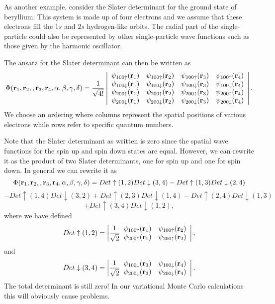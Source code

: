 As another example, consider the Slater determinant for the ground state of beryllium. This system
is made up of four electrons and we assume that these electrons fill the $1s$ and $2s$ hydrogen-like
orbits.  
The radial part of the single-particle could also be represented by other single-particle wave functions
such as those given by the harmonic oscillator.

The ansatz for the Slater determinant can then be written as  
\[
   \Phi({\bf r}_1,{\bf r}_2,,{\bf r}_3,{\bf r}_4, \alpha,\beta,\gamma,\delta)=\frac{1}{\sqrt{4!}}
\left| \begin{array}{cccc} \psi_{100\uparrow}({\bf r}_1)& \psi_{100\uparrow}({\bf r}_2)& \psi_{100\uparrow}({\bf r}_3)&\psi_{100\uparrow}({\bf r}_4) \\
\psi_{100\downarrow}({\bf r}_1)& \psi_{100\downarrow}({\bf r}_2)& \psi_{100\downarrow}({\bf r}_3)&\psi_{100\downarrow}({\bf r}_4) \\
\psi_{200\uparrow}({\bf r}_1)& \psi_{200\uparrow}({\bf r}_2)& \psi_{200\uparrow}({\bf r}_3)&\psi_{200\uparrow}({\bf r}_4) \\
\psi_{200\downarrow}({\bf r}_1)& \psi_{200\downarrow}({\bf r}_2)& \psi_{200\downarrow}({\bf r}_3)&\psi_{200\downarrow}({\bf r}_4) \end{array} \right|.
\]
We choose an ordering where columns represent the spatial positions of various
electrons while rows refer to specific quantum numbers.

Note that the Slater determinant as written is zero since the spatial wave functions for the spin up and spin down 
states are equal.   However, we can rewrite
it as the product of two Slater determinants, one for spin up and one for spin down.
In general we can rewrite it as 
\[
   \Phi({\bf r}_1,{\bf r}_2,,{\bf r}_3,{\bf r}_4, \alpha,\beta,\gamma,\delta)=Det\uparrow(1,2)Det\downarrow(3,4)-
Det\uparrow(1,3)Det\downarrow(2,4)
\]
\[
-Det\uparrow(1,4)Det\downarrow(3,2)+Det\uparrow(2,3)Det\downarrow(1,4)-Det\uparrow(2,4)Det\downarrow(1,3)
\]
\[
+Det\uparrow(3,4)Det\downarrow(1,2),
\]
where we have defined
\[
Det\uparrow(1,2)=\left| \frac{1}{\sqrt{2}}\begin{array}{cc} \psi_{100\uparrow}({\bf r}_1)& \psi_{100\uparrow}({\bf r}_2)\\
\psi_{200\uparrow}({\bf r}_1)& \psi_{200\uparrow}({\bf r}_2) \end{array} \right|,
\]
and 
\[
Det\downarrow(3,4)=\left| \frac{1}{\sqrt{2}}\begin{array}{cc} \psi_{100\downarrow}({\bf r}_3)& \psi_{100\downarrow}({\bf r}_4)\\
\psi_{200\downarrow}({\bf r}_3)& \psi_{200\downarrow}({\bf r}_4) \end{array} \right|.
\]
The total determinant is still zero!  In our variational Monte Carlo calculations this will obviously cause
problems.

